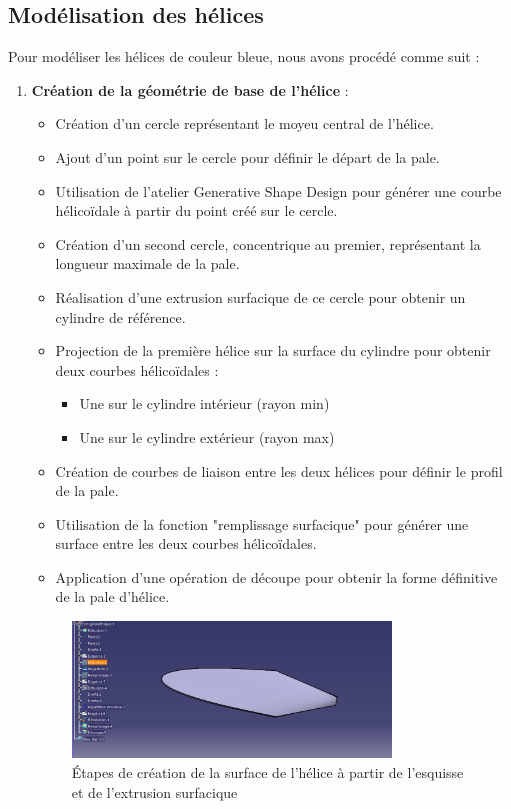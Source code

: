 \documentclass[a4paper,12pt]{report}
\begin{document}
\subsection{Modélisation des hélices}
Pour modéliser les hélices de couleur bleue, nous avons procédé comme suit :
\begin{enumerate}
    \item \textbf{Création de la géométrie de base de l'hélice} :
    \begin{itemize}
        \item Création d'un cercle représentant le moyeu central de l'hélice.
        \item Ajout d'un point sur le cercle pour définir le départ de la pale.
        \item Utilisation de l'atelier Generative Shape Design pour générer une courbe hélicoïdale à partir du point créé sur le cercle.
        \item Création d'un second cercle, concentrique au premier, représentant la longueur maximale de la pale.
        \item Réalisation d'une extrusion surfacique de ce cercle pour obtenir un cylindre de référence.
        \item Projection de la première hélice sur la surface du cylindre pour obtenir deux courbes hélicoïdales :
    \begin{itemize}
            \item Une sur le cylindre intérieur (rayon min)
            \item Une sur le cylindre extérieur (rayon max)
    \end{itemize}
        \item Création de courbes de liaison entre les deux hélices pour définir le profil de la pale.
        \item Utilisation de la fonction "remplissage surfacique" pour générer une surface entre les deux courbes hélicoïdales.
        \item Application d'une opération de découpe pour obtenir la forme définitive de la pale d'hélice.
    \end{itemize}
    \begin{figure}[H]
        \centering
        \includegraphics[width=0.8\textwidth]{images/esquisse_extrusion_helice.png}
        \caption{Étapes de création de la surface de l'hélice à partir de l'esquisse et de l'extrusion surfacique}
        \label{fig:esquisse_extrusion_helice}
    \end{figure}
    

\end{enumerate}
\end{document}
